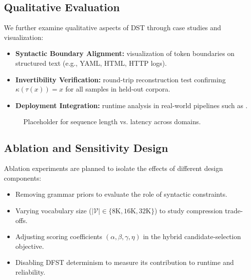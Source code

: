 \subsection{Qualitative Evaluation}

We further examine qualitative aspects of DST through case studies and visualization:

\begin{itemize}
  \item \textbf{Syntactic Boundary Alignment:} visualization of token boundaries on structured text (e.g., YAML, HTML, HTTP logs).
  \item \textbf{Invertibility Verification:} round-trip reconstruction test confirming $\kappa(\tau(x)) = x$ for all samples in held-out corpora.
  \item \textbf{Deployment Integration:} runtime analysis in real-world pipelines such as .
\end{itemize}

\begin{figure}[t]
  \centering
  \setlength{\fboxsep}{0pt}\fbox{\rule{0pt}{100pt}\rule{220pt}{0pt}}
  \caption{Placeholder for sequence length vs. latency across domains.}
  \label{fig:dst_efficiency}
\end{figure}

\subsection{Ablation and Sensitivity Design}

Ablation experiments are planned to isolate the effects of different design components:

\begin{itemize}
  \item Removing grammar priors to evaluate the role of syntactic constraints.
  \item Varying vocabulary size ($|\mathcal{V}| \in \{8\mathrm{K}, 16\mathrm{K}, 32\mathrm{K}\}$) to study compression trade-offs.
  \item Adjusting scoring coefficients $(\alpha, \beta, \gamma, \eta)$ in the hybrid candidate-selection objective.
  \item Disabling DFST determinism to measure its contribution to runtime and reliability.
\end{itemize}

